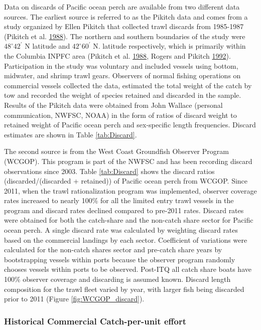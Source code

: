 \documentclass[12pt,]{article}
\begin{document}
Data on discards of Pacific ocean perch are available from two different
data sources. The earliest source is referred to as the Pikitch data and
comes from a study organized by Ellen Pikitch that collected trawl
discards from 1985-1987 (Pikitch et al.
\protect\hyperlink{ref-pikitch_evaluation_1988}{1988}). The northern and
southern boundaries of the study were \(48^\circ 42^\prime\) N latitude
and \(42^\circ 60^\prime\) N. latitude respectively, which is primarily
within the Columbia INPFC area (Pikitch et al.
\protect\hyperlink{ref-pikitch_evaluation_1988}{1988}, Rogers and
Pikitch \protect\hyperlink{ref-rogers_numerical_1992}{1992}).
Participation in the study was voluntary and included vessels using
bottom, midwater, and shrimp trawl gears. Observers of normal fishing
operations on commercial vessels collected the data, estimated the total
weight of the catch by tow and recorded the weight of species retained
and discarded in the sample. Results of the Pikitch data were obtained
from John Wallace (personal communication, NWFSC, NOAA) in the form of
ratios of discard weight to retained weight of Pacific ocean perch and
sex-specific length frequencies. Discard estimates are shown in Table
\ref{tab:Discard}.

The second source is from the West Coast Groundfish Observer Program
(WCGOP). This program is part of the NWFSC and has been recording
discard observations since 2003. Table \ref{tab:Discard} shows the
discard ratios (discarded/(discarded + retained)) of Pacific ocean perch
from WCGOP. Since 2011, when the trawl rationalization program was
implemented, observer coverage rates increased to nearly 100\% for all
the limited entry trawl vessels in the program and discard rates
declined compared to pre-2011 rates. Discard rates were obtained for
both the catch-share and the non-catch share sector for Pacific ocean
perch. A single discard rate was calculated by weighting discard rates
based on the commercial landings by each sector. Coefficient of
variations were calculated for the non-catch shares sector and pre-catch
share years by bootstrapping vessels within ports because the observer
program randomly chooses vessels within ports to be observed. Post-ITQ
all catch share boats have 100\% observer coverage and discarding is
assumed known. Discard length composition for the trawl fleet varied by
year, with larger fish being discarded prior to 2011 (Figure
\ref{fig:WCGOP_discard}).

\subsubsection{Historical Commercial Catch-per-unit
effort}\label{historical-commercial-catch-per-unit-effort}
\end{document}
